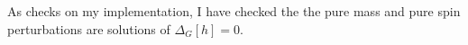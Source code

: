 \documentclass[aps,prd,amsmath,showpacs,amssymb,superscriptaddress,nofootinbib,longbibliography,eqsecnum,preprintnumbers]{revtex4-1}
\begin{document}
As checks on my implementation, I have checked the the pure mass and pure spin perturbations are solutions of $\Delta_G[h]=0$.
%
%
%
%
\end{document}
